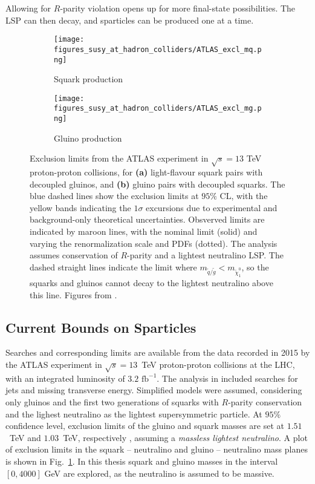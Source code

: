 \documentclass[twoside,english]{uiofysmaster}
\begin{document}
{Allowing for $R$-parity violation opens up for more final-state possibilities. The LSP can then decay, and sparticles can be produced one at a time. 


\begin{figure}[H]
    \centering
    \begin{subfigure}[b]{0.85\textwidth}
        \texttt{[image: figures\_susy\_at\_hadron\_colliders/ATLAS\_excl\_mq.png]}
        \caption{Squark production}
    \end{subfigure}
    \begin{subfigure}[b]{0.85\textwidth}
        \texttt{[image: figures\_susy\_at\_hadron\_colliders/ATLAS\_excl\_mg.png]}
        \caption{Gluino production}
    \end{subfigure}
    \caption{Exclusion limits from the ATLAS experiment in $\sqrt{s} = 13$ TeV proton-proton collisions, for \textbf{(a)} light-flavour squark pairs with decoupled gluinos, and \textbf{(b)} gluino pairs with decoupled squarks. The blue dashed lines show the exclusion limits at $95\%$ CL, with the yellow bands indicating the $1\sigma$ excursions due to experimental and background-only theoretical uncertainties. Obsverved limits are indicated by maroon lines, with the nominal limit (solid) and varying the renormalization scale and PDFs (dotted). The analysis assumes conservation of $R$-parity and a lightest neutralino LSP. The dashed straight lines indicate the limit where $m_{\widetilde{q}/\widetilde{g}} < m_{\widetilde{\chi}^0_1}$, so the squarks and gluinos cannot decay to the lightest neutralino above this line. Figures from \cite{aaboud2016search}.}\label{Fig:: susy hadron : ATLAS exclusion limits}
\end{figure}


\subsection{Current Bounds on Sparticles}



Searches and corresponding limits are available from the data recorded in 2015 by the ATLAS experiment in $\sqrt{s}=13$~TeV proton-proton collisions at the LHC, with an integrated luminosity of $3.2 \text{ fb}^{-1}$. The analysis in \cite{aaboud2016search} included searches for jets and missing transverse energy. Simplified models were assumed, considering only gluinos and the first two generations of squarks with $R$-parity conservation and the lighest neutralino as the lightest supersymmetric particle. At $95 \%$ confidence level, exclusion limits of the gluino and squark masses are set at $1.51$~TeV and $1.03$~TeV, respectively \cite{aaboud2016search}, assuming a \textit{massless lightest neutralino}. A plot of exclusion limits in the squark -- neutralino and gluino -- neutralino mass planes is shown in Fig.\ \ref{Fig:: susy hadron : ATLAS exclusion limits}. In this thesis squark and gluino masses in the interval $[0,4000]$ GeV are explored, as the neutralino is assumed to be massive.


}
\end{document}
